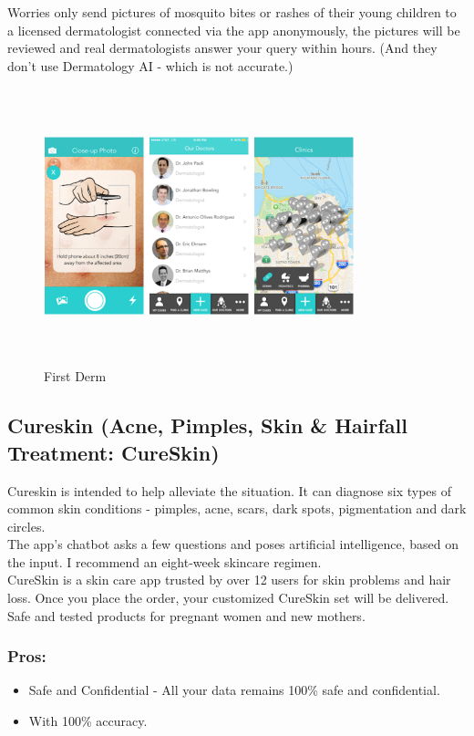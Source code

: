 Worries only send pictures of mosquito bites or rashes of their young children to a licensed dermatologist connected via the app anonymously, the pictures will be reviewed and real dermatologists answer your query within hours. 
(And they don't use Dermatology AI - which is not accurate.)
\begin{figure}[H]
 \centering 
 \includegraphics[height= 8cm, width=9cm]{backmatter/figures/FirstDerm1.PNG}
 \caption{First Derm}
 \end{figure}
 
\subsection{Cureskin (Acne, Pimples, Skin \& Hairfall Treatment: CureSkin)}
Cureskin is intended to help alleviate the situation. It can diagnose six types of common skin conditions - pimples, acne, scars, dark spots, pigmentation and dark circles.\\

The app's chatbot asks a few questions and poses artificial intelligence, based on the input. I recommend an eight-week skincare regimen.\\

CureSkin is a skin care app trusted by over 12 users for skin problems and hair loss. Once you place the order, your customized CureSkin set will be delivered.\\
Safe and tested products for pregnant women and new mothers.
 \subsubsection{Pros:}
 \begin{itemize}
     \item Safe and Confidential - All your data remains 100\% safe and confidential.\\
     \item With 100\% accuracy.\\
 \end{itemize}
